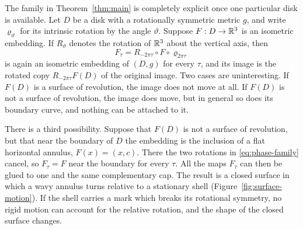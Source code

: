 The family in Theorem~\ref{thm:main} is completely explicit once one
particular disk is available. Let $D$ be a disk with a rotationally
symmetric metric $g$, and write $\varrho_\vartheta$ for its intrinsic
rotation by the angle $\vartheta$. Suppose $F:D\to\mathbb R^3$ is an isometric
embedding. If $R_\vartheta$ denotes the rotation of $\mathbb R^3$ about the
vertical axis, then
\begin{equation}\label{eq:phase-family}
 F_\tau=R_{-2\pi\tau}\circ F\circ\varrho_{2\pi\tau}
\end{equation}
is again an isometric embedding of $(D,g)$ for every $\tau$, and its
image is the rotated copy $R_{-2\pi\tau}F(D)$ of the original image.
Two cases are uninteresting. If $F(D)$ is a surface of revolution,
the image does not move at all. If $F(D)$ is not a surface of
revolution, the image does move, but in general so does its boundary
curve, and nothing can be attached to it.

There is a third possibility. Suppose that $F(D)$ is not a surface of
revolution, but that near the boundary of $D$ the embedding is the
inclusion of a flat horizontal annulus, $F(x)=(x,c)$. There the two
rotations in \eqref{eq:phase-family} cancel, so $F_\tau=F$ near the
boundary for every $\tau$. All the maps $F_\tau$ can then be glued to
one and the same complementary cap. The result is a closed surface in
which a wavy annulus turns relative to a stationary shell
(Figure~\ref{fig:surface-motion}). If the shell carries a mark which
breaks its rotational symmetry, no rigid motion can account for the
relative rotation, and the shape of the closed surface changes.

